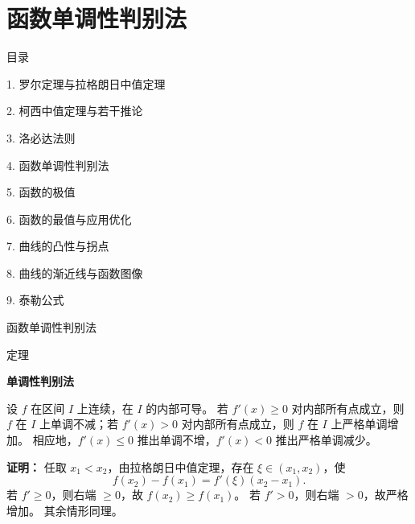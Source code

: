 \documentclass[aspectratio=169,10pt,fontset=fandol]{ctexbeamer}
\begin{document}
\section{函数单调性判别法}
\begin{frame}[t,fragile]{目录}
\normalsize
{\color{black}\normalsize 1. 罗尔定理与拉格朗日中值定理\par}\vspace{0.22em}
{\color{black}\normalsize 2. 柯西中值定理与若干推论\par}\vspace{0.22em}
{\color{black}\normalsize 3. 洛必达法则\par}\vspace{0.22em}
{\color{blue}\normalsize 4. 函数单调性判别法\par}\vspace{0.22em}
{\color{gray!40}\normalsize 5. 函数的极值\par}\vspace{0.22em}
{\color{gray!40}\normalsize 6. 函数的最值与应用优化\par}\vspace{0.22em}
{\color{gray!40}\normalsize 7. 曲线的凸性与拐点\par}\vspace{0.22em}
{\color{gray!40}\normalsize 8. 曲线的渐近线与函数图像\par}\vspace{0.22em}
{\color{gray!40}\normalsize 9. 泰勒公式\par}\vspace{0.22em}
\end{frame}
\begin{frame}[t,fragile]{函数单调性判别法}
\normalsize
\begin{block}{定理}
{\normalsize
\textbf{单调性判别法}\par

设 $f$ 在区间 $I$ 上连续，在 $I$ 的内部可导。 若 $f'(x)\geq0$ 对内部所有点成立，则 $f$ 在 $I$ 上单调不减；若 $f'(x)>0$ 对内部所有点成立，则 $f$ 在 $I$ 上严格单调增加。 相应地，$f'(x)\leq0$ 推出单调不增，$f'(x)<0$ 推出严格单调减少。

}
\end{block}
\pause
{\normalsize
\textbf{证明：}
任取 $x_1<x_2$，由拉格朗日中值定理，存在 $\xi\in(x_1,x_2)$，使
\[
f(x_2)-f(x_1)=f'(\xi)(x_2-x_1).
\]
若 $f'\geq0$，则右端 $\geq0$，故 $f(x_2)\geq f(x_1)$。 若 $f'>0$，则右端 $>0$，故严格增加。 其余情形同理。

}
\end{frame}
\end{document}
